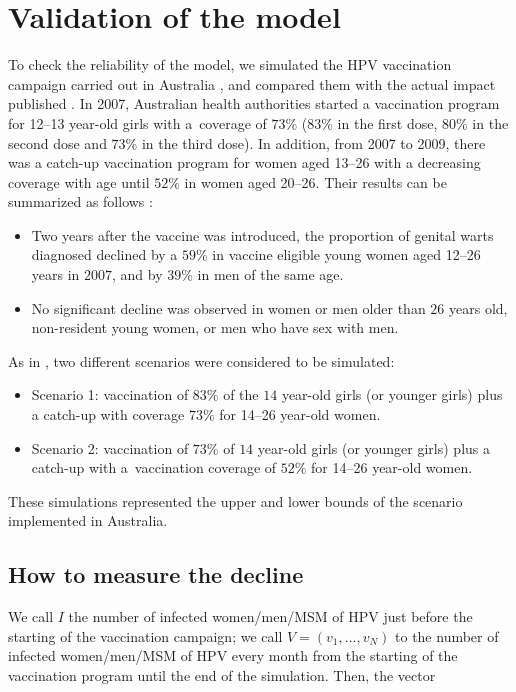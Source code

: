 \chapter{Validation of the model}\label{Australiano}

To check the reliability of the model, we simulated the HPV vaccination campaign carried out in Australia \cite{ali2013genital}, and compared them with the actual impact published \cite{ali2013genital}. In 2007, Australian health authorities started a vaccination program for 12--13 year-old girls with a~coverage of $73\%$ ($83\%$ in the first dose, $80\%$ in the second dose and $73\%$ in the third dose). In addition, from 2007 to 2009, there was a catch-up vaccination program for women aged 13--26 with a decreasing coverage with age until $52\%$ in women aged 20--26. Their results can be summarized as follows \cite{ali2013genital}:

\begin{itemize}
	\item Two years after the vaccine was introduced, the proportion of genital warts diagnosed declined by a $59\%$ in vaccine eligible young women aged 12--26 years in $2007$, and by $39\%$ in men of the same age.
	\item No significant decline was observed in women or men older than $26$ years old, non-resident young women, or men who have sex with men.
\end{itemize}

As in \cite{DezDomingo2017}, two different scenarios were considered to be simulated:

\begin{itemize}
	\item Scenario 1: vaccination of $83\%$ of the $14$ year-old girls (or younger girls) plus a catch-up with coverage $73\%$ for 14--26 year-old women.
	\item Scenario 2: vaccination of $73\%$ of $14$ year-old girls (or younger girls) plus a catch-up with a~vaccination coverage of $52\%$ for 14--26 year-old women.
\end{itemize}

These simulations represented the upper and lower bounds of the scenario implemented in Australia. 

\section{How to measure the decline}\label{sec:decline}
We call $I$ the number of infected women/men/MSM of HPV just before the starting of the vaccination campaign; we call $V = ( v_1, \ldots, v_N)$ to the number of infected women/men/MSM of HPV every month from the starting of the vaccination program until the end of the simulation. Then, the vector 

